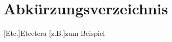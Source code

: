 \chapter*{Abkürzungsverzeichnis}
\begin{acronym}[LONGESTWORD]\itemsep0pt
    [Etc.]{Etcetera}
    [z.B.]{zum Beispiel}
\end{acronym}